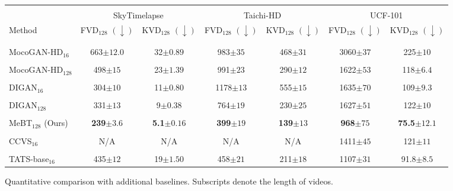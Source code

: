 \documentclass[10pt,twocolumn,letterpaper]{article}
\begin{document}
\iffalse
\begin{figure*}[!t]
    \begin{minipage}{\textwidth}
    \captionsetup{type=table}
    \centering
    \caption{Quantitative comparison with additional baselines. Subscripts denote the length of videos.}
    \vspace{-0.2cm}
\begin{adjustbox}{width=0.8\textwidth}
    \label{tab:longterm}
    \centering
        \begin{tabular}{lcccccc}
        \toprule
        \\[-1em]& \multicolumn{2}{c}{SkyTimelapse} & \multicolumn{2}{c}{Taichi-HD} & \multicolumn{2}{c}{UCF-101} \\
        \cmidrule(lr){2-3} \cmidrule(lr){4-5} \cmidrule(lr){6-7}
        Method 
        & FVD$_{128}$  $(\downarrow)$ & KVD$_{128}$  $(\downarrow)$ & FVD$_{128}$  $(\downarrow)$ & KVD$_{128}$  $(\downarrow)$ 
        & FVD$_{128}$  $(\downarrow)$ & KVD$_{128}$  $(\downarrow)$ \\
        \\[-1em]\Xhline{2\arrayrulewidth}
        \\[-1em]MocoGAN-HD$_{16}$ & 663\tiny{$\pm 12.0$} & 32\tiny{$\pm0.89$} & 983\tiny{$\pm35$} & 468\tiny{$\pm31$} & 3060\tiny{$\pm37$} & 225\tiny{$\pm10$}\\
        \\[-1em]MocoGAN-HD$_{128}$ & {498\tiny{$\pm 15$}} & {23\tiny{$\pm1.39$}} & {991\tiny{$\pm23$}} & {290\tiny{$\pm12$}} & {1622\tiny{$\pm53$}} & {118\tiny{$\pm6.4$}}\\
        \\[-1em]DIGAN$_{16}$ & 304\tiny{$\pm10$} & 11\tiny{$\pm0.80$} & 1178\tiny{$\pm13$} & 555\tiny{$\pm15$} & 1635\tiny{$\pm70$} & 109\tiny{$\pm9.3$}\\
        \\[-1em]DIGAN$_{128}$ & 331\tiny{$\pm13$} & 9\tiny{$\pm0.38$} & 764\tiny{$\pm19$} & 230\tiny{$\pm25$} & 1627\tiny{$\pm51$} & 122\tiny{$\pm10$}\\
\\[-1em]MeBT$_{128}$ (Ours) & \bf{239\tiny{$\pm3.6$}} & \bf{5.1\tiny{$\pm0.16$}} & \bf{399\tiny{$\pm19$}} & \bf{139\tiny{$\pm13$}} & \bf{968\tiny{$\pm75$}} & \bf{75.5\tiny{$\pm12.1$}}\\
        \hline
        \\[-1em]CCVS$_{16}$ & N/A & N/A & N/A & N/A & 1411\tiny{$\pm45$} & 121\tiny{$\pm11$} \\
        \\[-1em]TATS-base$_{16}$ & 435\tiny{$\pm12$} & 19\tiny{$\pm1.50$} & 458\tiny{$\pm21$} & 211\tiny{$\pm18$} & 1107\tiny{$\pm31$} & 91.8\tiny{$\pm8.5$}\\

\end{tabular}
\end{adjustbox}
\end{minipage}
\end{figure*}
\end{document}
